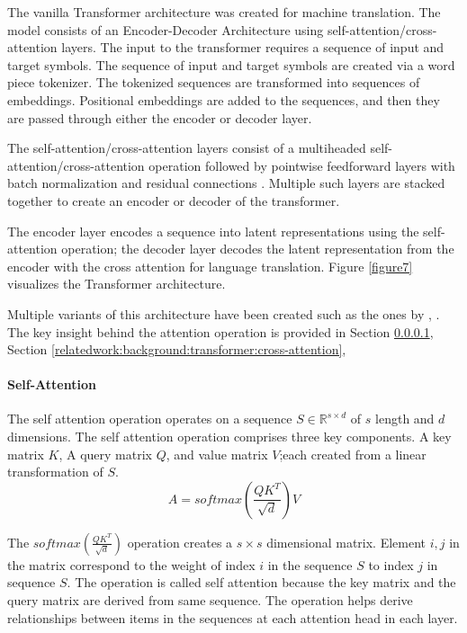 The vanilla Transformer architecture \parencite{vaswani2017attention} was created for machine translation. The model consists of an Encoder-Decoder Architecture using self-attention/cross-attention layers. The input to the transformer requires a sequence of input and target symbols. The sequence of input and target symbols are created via a word piece tokenizer. The tokenized sequences are transformed into sequences of embeddings. Positional embeddings are added to the sequences, and then they are passed through either the encoder or decoder layer.

The self-attention/cross-attention layers consist of a multiheaded self-attention/cross-attention operation followed by pointwise feedforward layers with batch normalization \parencite{ioffe2015batch} and residual connections \parencite{he2016deep}. Multiple such layers are stacked together to create an encoder or decoder of the transformer. 

The encoder layer encodes a sequence into latent representations using the self-attention operation; the decoder layer decodes the latent representation from the encoder with the cross attention for language translation. Figure \ref{figure7} visualizes the Transformer architecture. 

Multiple variants of this architecture have been created such as the ones by \cite{radford2019language}, \cite{devlin2018bert}. The key insight behind the attention operation is provided in Section \ref{relatedwork:background:transformer:attention}, Section \ref{relatedwork:background:transformer:cross-attention}, 

\paragraph{Self-Attention}
\label{relatedwork:background:transformer:attention}
The self attention operation operates on a sequence $S \in \mathbb{R}^{s \times d}$ of $s$ length and $d$ dimensions. The self attention operation comprises three key components. A key matrix $K$, A query matrix $Q$, and value matrix $V$;each created from a linear transformation of $S$. 
$$A = softmax(\frac{QK^T}{\sqrt{d}})V$$

The $softmax(\frac{QK^T}{\sqrt{d}})$ operation creates a $s \times s$ dimensional matrix. Element ${i,j}$ in the matrix correspond to the weight of index $i$ in the sequence $S$ to index $j$ in sequence $S$. The operation is called self attention because the key matrix and the query matrix are derived from same sequence. The operation helps derive relationships between items in the sequences at each attention head in each layer. 

